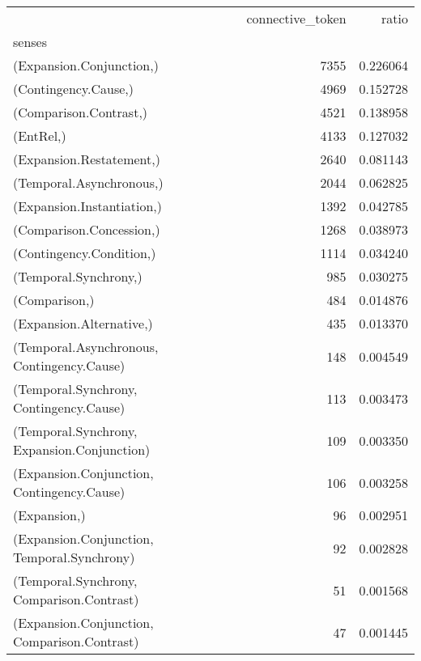 \begin{tabular}{lrr}
\toprule
{} &  connective\_token &     ratio \\
senses                                       &                   &           \\
\midrule
(Expansion.Conjunction,)                     &              7355 &  0.226064 \\
(Contingency.Cause,)                         &              4969 &  0.152728 \\
(Comparison.Contrast,)                       &              4521 &  0.138958 \\
(EntRel,)                                    &              4133 &  0.127032 \\
(Expansion.Restatement,)                     &              2640 &  0.081143 \\
(Temporal.Asynchronous,)                     &              2044 &  0.062825 \\
(Expansion.Instantiation,)                   &              1392 &  0.042785 \\
(Comparison.Concession,)                     &              1268 &  0.038973 \\
(Contingency.Condition,)                     &              1114 &  0.034240 \\
(Temporal.Synchrony,)                        &               985 &  0.030275 \\
(Comparison,)                                &               484 &  0.014876 \\
(Expansion.Alternative,)                     &               435 &  0.013370 \\
(Temporal.Asynchronous, Contingency.Cause)   &               148 &  0.004549 \\
(Temporal.Synchrony, Contingency.Cause)      &               113 &  0.003473 \\
(Temporal.Synchrony, Expansion.Conjunction)  &               109 &  0.003350 \\
(Expansion.Conjunction, Contingency.Cause)   &               106 &  0.003258 \\
(Expansion,)                                 &                96 &  0.002951 \\
(Expansion.Conjunction, Temporal.Synchrony)  &                92 &  0.002828 \\
(Temporal.Synchrony, Comparison.Contrast)    &                51 &  0.001568 \\
(Expansion.Conjunction, Comparison.Contrast) &                47 &  0.001445 \\
\bottomrule
\end{tabular}
